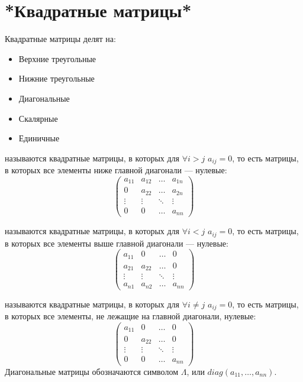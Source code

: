 \section{*Квадратные матрицы*}
Квадратные матрицы делят на:
\begin{itemize}
\item Верхние треугольные
\item Нижние треугольные
\item Диагональные
\item Скалярные
\item Единичные
\end{itemize}
\begin{opred}
 называются квадратные матрицы, в которых для $\forall{}i>j$ $a_{ij}=0$, то есть матрицы, в которых все элементы ниже главной диагонали --- нулевые:
$$
\begin{pmatrix}
a_{11}& a_{12}& \ldots& a_{1n} \\
0&      a_{22}& \ldots& a_{2n} \\
\vdots& \vdots& \ddots& \vdots \\
0&      0&      \ldots& a_{nn}
\end{pmatrix}
$$
\end{opred}
\begin{opred}
 называются квадратные матрицы, в которых для $\forall{}i<j$ $a_{ij}=0$, то есть матрицы, в которых все элементы выше главной диагонали --- нулевые:
$$
\begin{pmatrix}
a_{11}& 0&      \ldots& 0      \\
a_{21}& a_{22}& \ldots& 0      \\
\vdots& \vdots& \ddots& \vdots \\
a_{n1}& a_{n2}& \ldots& a_{nn}
\end{pmatrix}
$$
\end{opred}
\begin{opred}
 называются квадратные матрицы, в которых для $\forall{}i\ne{}j$ $a_{ij}=0$, то есть матрицы, в которых все элементы, не лежащие на главной диагонали, нулевые:
$$
\begin{pmatrix}
a_{11}& 0&      \ldots& 0      \\
0&      a_{22}& \ldots& 0      \\
\vdots& \vdots& \ddots& \vdots \\
0&      0&      \ldots& a_{nn}
\end{pmatrix}
$$
Диагональные матрицы обозначаются символом $\Lambda$, или $diag(a_{11},\ldots,a_{nn})$.
\end{opred}
